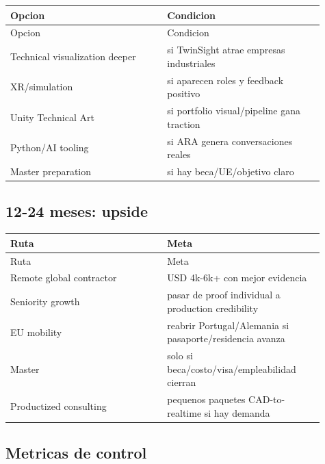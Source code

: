 \begin{center}
\scriptsize
\begin{longtable}{>{\raggedright\arraybackslash}p{0.455\linewidth} >{\raggedright\arraybackslash}p{0.455\linewidth}}
\toprule
Opcion & Condicion \\
\midrule
\endfirsthead
\toprule
Opcion & Condicion \\
\midrule
\endhead
Technical visualization deeper & si TwinSight atrae empresas industriales \\
XR/simulation & si aparecen roles y feedback positivo \\
Unity Technical Art & si portfolio visual/pipeline gana traction \\
Python/AI tooling & si ARA genera conversaciones reales \\
Master preparation & si hay beca/UE/objetivo claro \\
\bottomrule
\end{longtable}
\end{center}


\subsection{12-24 meses: upside}


\begin{center}
\scriptsize
\begin{longtable}{>{\raggedright\arraybackslash}p{0.455\linewidth} >{\raggedright\arraybackslash}p{0.455\linewidth}}
\toprule
Ruta & Meta \\
\midrule
\endfirsthead
\toprule
Ruta & Meta \\
\midrule
\endhead
Remote global contractor & USD 4k-6k+ con mejor evidencia \\
Seniority growth & pasar de proof individual a production credibility \\
EU mobility & reabrir Portugal/Alemania si pasaporte/residencia avanza \\
Master & solo si beca/costo/visa/empleabilidad cierran \\
Productized consulting & pequenos paquetes CAD-to-realtime si hay demanda \\
\bottomrule
\end{longtable}
\end{center}


\subsection{Metricas de control}



